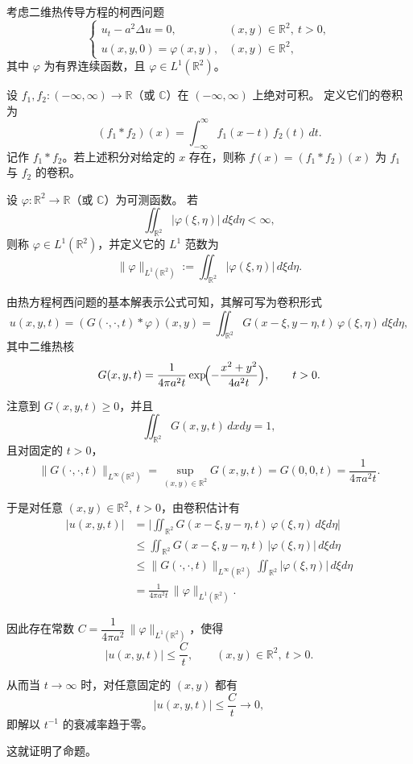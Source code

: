 \begin{solution}
考虑二维热传导方程的柯西问题
\[
\begin{cases}
u_t-a^2\Delta u=0, & (x,y)\in\mathbb R^2,\ t>0,\\[0.3em]
u(x,y,0)=\varphi(x,y), & (x,y)\in\mathbb R^2,
\end{cases}
\]
其中 $\varphi$ 为有界连续函数，且 $\varphi\in L^1(\mathbb R^2)$。
\begin{definition}[卷积]
设 $f_1,f_2:(-\infty,\infty)\to\mathbb{R}$（或 $\mathbb{C}$）在 $(-\infty,\infty)$ 上绝对可积。
定义它们的卷积为
\[
(f_1*f_2)(x)=\int_{-\infty}^{\infty} f_1(x-t)\,f_2(t)\,dt.
\]
记作 $f_1*f_2$。若上述积分对给定的 $x$ 存在，则称 $f(x)=(f_1*f_2)(x)$ 为 $f_1$ 与 $f_2$ 的卷积。
\end{definition}
\begin{definition}
设 $\varphi:\mathbb{R}^{2}\to\mathbb{R}$（或 $\mathbb{C}$）为可测函数。
若
\[
\iint_{\mathbb{R}^{2}} |\varphi(\xi,\eta)|\,d\xi d\eta<\infty,
\]
则称 $\varphi\in L^{1}(\mathbb{R}^{2})$，并定义它的 $L^{1}$ 范数为
\[
\|\varphi\|_{L^{1}(\mathbb{R}^{2})}
:=\iint_{\mathbb{R}^{2}} |\varphi(\xi,\eta)|\,d\xi d\eta.
\]
\end{definition}
由热方程柯西问题的基本解表示公式可知，其解可写为卷积形式
\[
u(x,y,t)=(G(\cdot,\cdot,t)*\varphi)(x,y)
   =\iint_{\mathbb R^2} G(x-\xi,y-\eta,t)\,\varphi(\xi,\eta)\,d\xi d\eta,
\]
其中二维热核
\[
G(x,y,t)=\frac1{4\pi a^2 t}
\exp\!\Bigl(-\frac{x^2+y^2}{4a^2 t}\Bigr),\qquad t>0.
\]

注意到 $G(x,y,t)\ge0$，并且
\[
\iint_{\mathbb R^2} G(x,y,t)\,dxdy=1,
\]
且对固定的 $t>0$，
\[
\|G(\cdot,\cdot,t)\|_{L^\infty(\mathbb R^2)}
 =\sup_{(x,y)\in\mathbb R^2} G(x,y,t)
 = G(0,0,t)
 =\frac1{4\pi a^2 t}.
\]

于是对任意 $(x,y)\in\mathbb R^2,\ t>0$，由卷积估计有
\[
\begin{aligned}
|u(x,y,t)|
&=\biggl|\iint_{\mathbb R^2} G(x-\xi,y-\eta,t)\,\varphi(\xi,\eta)\,d\xi d\eta\biggr|\\[0.3em]
&\le \iint_{\mathbb R^2} G(x-\xi,y-\eta,t)\,|\varphi(\xi,\eta)|\,d\xi d\eta\\[0.3em]
&\le \|G(\cdot,\cdot,t)\|_{L^\infty(\mathbb R^2)}
      \iint_{\mathbb R^2} |\varphi(\xi,\eta)|\,d\xi d\eta\\[0.3em]
&= \frac1{4\pi a^2 t}\,\|\varphi\|_{L^1(\mathbb R^2)}.
\end{aligned}
\]

因此存在常数 $C=\dfrac1{4\pi a^2}\,\|\varphi\|_{L^1(\mathbb R^2)}$，使得
\[
|u(x,y,t)|\le \frac{C}{t},\qquad (x,y)\in\mathbb R^2,\ t>0.
\]

从而当 $t\to\infty$ 时，对任意固定的 $(x,y)$ 都有
\[
|u(x,y,t)|\le \frac{C}{t}\longrightarrow 0,
\]
即解以 $t^{-1}$ 的衰减率趋于零。

这就证明了命题。
\end{solution}
